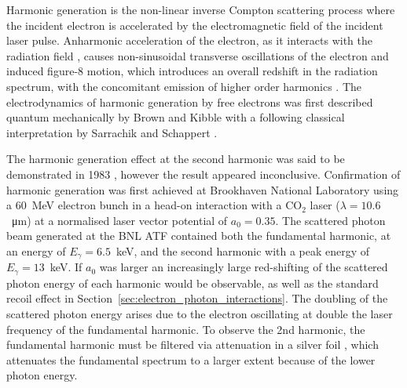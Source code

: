 \documentclass[../main.tex]{subfiles}
\begin{document}
Harmonic generation is the non-linear inverse Compton scattering process where the incident electron is accelerated by the electromagnetic field of the incident laser pulse. Anharmonic acceleration of the electron, as it interacts with the radiation field \cite{englert1983second}, causes non-sinusoidal transverse oscillations of the electron and induced figure-8 motion, which introduces an overall redshift in the radiation
spectrum, with the concomitant emission of higher order harmonics \cite{sakai2015observation}. The electrodynamics of harmonic generation by free electrons was first described quantum mechanically by Brown and Kibble \cite{brown1964interaction,kibble1965frequency} with a following classical interpretation by Sarrachik and Schappert \cite{sarachik1970classical}. 

The harmonic generation effect at the second harmonic was said to be demonstrated in 1983 \cite{englert1983second}, however the result appeared inconclusive. Confirmation of harmonic generation was first achieved at Brookhaven National Laboratory \cite{babzien2006observation,kumita2006observation} using a 60~\si{\mega\electronvolt} electron bunch in a head-on interaction with a CO$_{2}$ laser ($\lambda = 10.6$~\si{\micro\meter}) at a normalised laser vector potential of $a_{0} = 0.35$. The scattered photon beam generated at the BNL ATF contained both the fundamental harmonic, at an energy of $E_{\gamma} = 6.5$~\si{\kilo\electronvolt}, and the second harmonic with a peak energy of $E_{\gamma} = 13$~\si{\kilo\electronvolt}. If $a_{0}$ was larger an increasingly large red-shifting of the scattered photon energy of each harmonic \cite{kibble1965frequency,sakai2015observation} would be observable, as well as the standard recoil effect in Section~\ref{sec:electron_photon_interactions}. The doubling of the scattered photon energy arises due to the electron oscillating at double the laser frequency of the fundamental harmonic. To observe the 2nd harmonic, the fundamental harmonic must be filtered via attenuation in a silver foil \cite{babzien2006observation}, which attenuates the fundamental spectrum to a larger extent because of the lower photon energy.
\end{document}
